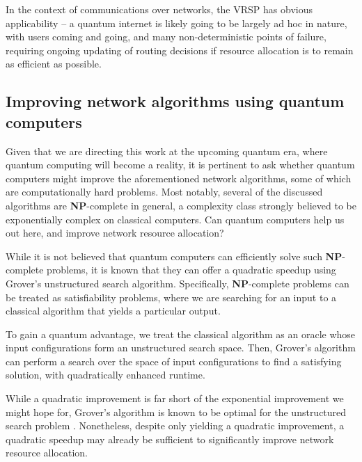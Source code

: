 \documentclass[aps,rmp,twocolumn,amsmath,amssymb,nofootinbib,superscriptaddress,longbibliography,floatfix,table-of-contents,eqsecnum]{revtex4-1}
\begin{document}
In the context of communications over networks, the VRSP has obvious applicability -- a quantum internet is likely going to be largely ad hoc in nature, with users coming and going, and many non-deterministic points of failure, requiring ongoing updating of routing decisions if resource allocation is to remain as efficient as possible.

%
%

\subsection{Improving network algorithms using quantum computers} 

Given that we are directing this work at the upcoming quantum era, where quantum computing will become a reality, it is pertinent to ask whether quantum computers might improve the aforementioned network algorithms, some of which are computationally hard problems. Most notably, several of the discussed algorithms are \textbf{NP}-complete in general, a complexity class strongly believed to be exponentially complex on classical computers. Can quantum computers help us out here, and improve network resource allocation?

While it is not believed that quantum computers can efficiently solve such \textbf{NP}-complete problems, it is known that they can offer a quadratic speedup using Grover's unstructured search algorithm. Specifically, \textbf{NP}-complete problems can be treated as satisfiability problems, where we are searching for an input to a classical algorithm that yields a particular output.

To gain a quantum advantage, we treat the classical algorithm as an oracle whose input configurations form an unstructured search space. Then, Grover's algorithm can perform a search over the space of input configurations to find a satisfying solution, with quadratically enhanced runtime.

While a quadratic improvement is far short of the exponential improvement we might hope for, Grover's algorithm is known to be optimal for the unstructured search problem \cite{?}. Nonetheless, despite only yielding a quadratic improvement, a quadratic speedup may already be sufficient to significantly improve network resource allocation.
\end{document}
